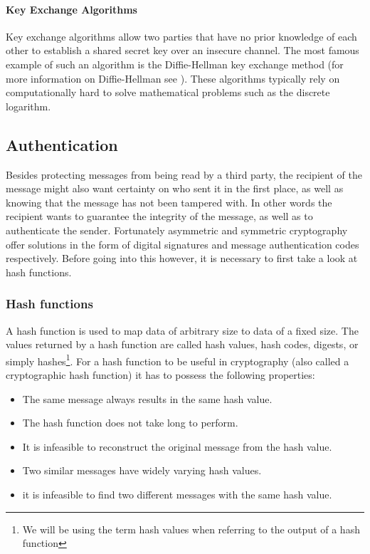 \documentclass[11pt]{article}
\begin{document}
\paragraph{Key Exchange Algorithms} Key exchange algorithms allow two parties that have no prior knowledge of each other to establish a shared secret key over an insecure channel. The most famous example of such an algorithm is the Diffie-Hellman key exchange method (for more information on Diffie-Hellman see \cite{DiffieHellmanwiki}). These algorithms typically rely on computationally hard to solve mathematical problems such as the discrete logarithm.

\subsection{Authentication} Besides protecting messages from being read by a third party, the recipient of the message might also want certainty on who sent it in the first place, as well as knowing that the message has not been tampered with. In other words the recipient wants to guarantee the integrity of the message, as well as to authenticate the sender. Fortunately asymmetric and symmetric cryptography offer solutions in the form of digital signatures and message authentication codes respectively. Before going into this however, it is necessary to first take a look at hash functions.

\subsubsection{Hash functions} A hash function is used to map data of arbitrary size to data of a fixed size. The values returned by a hash function are called hash values, hash codes, digests, or simply hashes\footnote{We will be using the term hash values when referring to the output of a hash function}. For a hash function to be useful in cryptography (also called a cryptographic hash function) it has to possess the following properties\cite{Hashwiki}:

\begin{itemize}
	\item The same message always results in the same hash value.
	\item The hash function does not take long to perform.
	\item It is infeasible to reconstruct the original message from the hash value.
	\item Two similar messages have widely varying hash values.
	\item it is infeasible to find two different messages with the same hash value.
\end{itemize}
\end{document}
